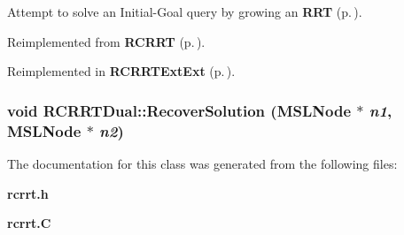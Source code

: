 Attempt to solve an Initial-Goal query by growing an {\bf RRT} {\rm (p.\,\pageref{classRRT})}.



Reimplemented from {\bf RCRRT} {\rm (p.\,\pageref{classRCRRT_a10})}.

Reimplemented in {\bf RCRRTExt\-Ext} {\rm (p.\,\pageref{classRCRRTExtExt_a2})}.
\subsubsection{\setlength{\rightskip}{0pt plus 5cm}void RCRRTDual::Recover\-Solution ({\bf MSLNode} $\ast$ {\em n1}, {\bf MSLNode} $\ast$ {\em n2})\hspace{0.3cm}{\tt  [protected]}}\label{classRCRRTDual_b0}




The documentation for this class was generated from the following files:\begin{CompactItemize}
\item 
{\bf rcrrt.h}\item 
{\bf rcrrt.C}\end{CompactItemize}
